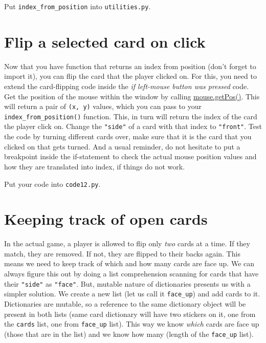 \documentclass[
]{book}
\begin{document}
Put \texttt{index\_from\_position} into \texttt{utilities.py}.

\hypertarget{flip-a-selected-card-on-click}{%
\section{Flip a selected card on click}\label{flip-a-selected-card-on-click}}

Now that you have function that returns an index from position (don't forget to import it), you can flip the card that the player clicked on. For this, you need to extend the card-flipping code inside the \emph{if left-mouse button was pressed} code. Get the position of the mouse within the window by calling \href{https://psychopy.org/api/event.html\#psychopy.event.Mouse.getPos}{mouse.getPos()}. This will return a pair of \texttt{(x,\ y)} values, which you can pass to your \texttt{index\_from\_position()} function. This, in turn will return the index of the card the player click on. Change the \texttt{"side"} of a card with that index to \texttt{"front"}. Test the code by turning different cards over, make sure that it is the card that you clicked on that gets turned. And a usual reminder, do not hesitate to put a breakpoint inside the if-statement to check the actual mouse position values and how they are translated into index, if things do not work.

Put your code into \texttt{code12.py}.

\hypertarget{keeping-track-of-open-cards}{%
\section{Keeping track of open cards}\label{keeping-track-of-open-cards}}

In the actual game, a player is allowed to flip only \emph{two} cards at a time. If they match, they are removed. If not, they are flipped to their backs again. This means we need to keep track of which and how many cards are face up. We can always figure this out by doing a list comprehension scanning for cards that have their \texttt{"side"} as \texttt{"face"}. But, mutable nature of dictionaries presents us with a simpler solution. We create a new list (let us call it \texttt{face\_up}) and add cards to it. Dictionaries are mutable, so a reference to the same dictionary object will be present in both lists (same card dictionary will have two stickers on it, one from the \texttt{cards} list, one from \texttt{face\_up} list). This way we know \emph{which} cards are face up (those that are in the list) and we know how many (length of the \texttt{face\_up} list).
\end{document}
